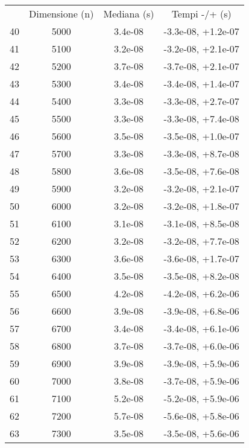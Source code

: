 \begin{table}
\centering
\begin{adjustbox}{width=1\textwidth/2}
\begin{tabular}{|c|c|c|c|}
\hline
 & Dimensione (n) & Mediana (s) & Tempi -/+ (s) \\
40 & 5000 & 3.4e-08 & -3.3e-08, +1.2e-07 \\
\cline{1-4}
41 & 5100 & 3.2e-08 & -3.2e-08, +2.1e-07 \\
\cline{1-4}
42 & 5200 & 3.7e-08 & -3.7e-08, +2.1e-07 \\
\cline{1-4}
43 & 5300 & 3.4e-08 & -3.4e-08, +1.4e-07 \\
\cline{1-4}
44 & 5400 & 3.3e-08 & -3.3e-08, +2.7e-07 \\
\cline{1-4}
45 & 5500 & 3.3e-08 & -3.3e-08, +7.4e-08 \\
\cline{1-4}
46 & 5600 & 3.5e-08 & -3.5e-08, +1.0e-07 \\
\cline{1-4}
47 & 5700 & 3.3e-08 & -3.3e-08, +8.7e-08 \\
\cline{1-4}
48 & 5800 & 3.6e-08 & -3.5e-08, +7.6e-08 \\
\cline{1-4}
49 & 5900 & 3.2e-08 & -3.2e-08, +2.1e-07 \\
\cline{1-4}
50 & 6000 & 3.2e-08 & -3.2e-08, +1.8e-07 \\
\cline{1-4}
51 & 6100 & 3.1e-08 & -3.1e-08, +8.5e-08 \\
\cline{1-4}
52 & 6200 & 3.2e-08 & -3.2e-08, +7.7e-08 \\
\cline{1-4}
53 & 6300 & 3.6e-08 & -3.6e-08, +1.7e-07 \\
\cline{1-4}
54 & 6400 & 3.5e-08 & -3.5e-08, +8.2e-08 \\
\cline{1-4}
55 & 6500 & 4.2e-08 & -4.2e-08, +6.2e-06 \\
\cline{1-4}
56 & 6600 & 3.9e-08 & -3.9e-08, +6.8e-06 \\
\cline{1-4}
57 & 6700 & 3.4e-08 & -3.4e-08, +6.1e-06 \\
\cline{1-4}
58 & 6800 & 3.7e-08 & -3.7e-08, +6.0e-06 \\
\cline{1-4}
59 & 6900 & 3.9e-08 & -3.9e-08, +5.9e-06 \\
\cline{1-4}
60 & 7000 & 3.8e-08 & -3.7e-08, +5.9e-06 \\
\cline{1-4}
61 & 7100 & 5.2e-08 & -5.2e-08, +5.9e-06 \\
\cline{1-4}
62 & 7200 & 5.7e-08 & -5.6e-08, +5.8e-06 \\
\cline{1-4}
63 & 7300 & 3.5e-08 & -3.5e-08, +5.6e-06 \\

\end{tabular}
\end{adjustbox}
\end{table}
